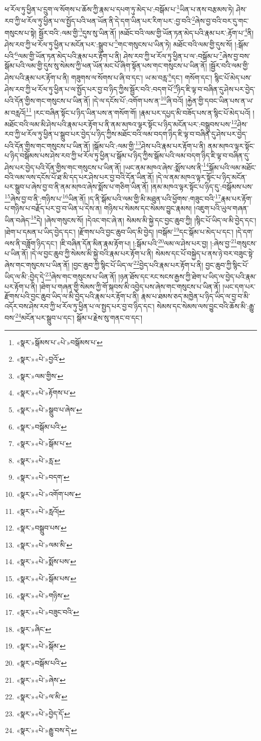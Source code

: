 ཕ་རོལ་ཏུ་ཕྱིན་པ་དྲུག་ལ་སོགས་པ་ཆོས་ཀྱི་རྣམ་པ་དཔག་ཏུ་མེད་པ་:བསྒོམ་པ་\footnote{«སྣར་»སྒོམས་པ་«པེ་»བསྒོམས་པ་}ཡིན་པ་ནས་བརྩམས་ཏེ། ཤེས་རབ་ཀྱི་ཕ་རོལ་ཏུ་ཕྱིན་པ་ལ་སྤྱོད་པའི་ཕན་ཡོན་ནི་དེ་དག་ཡིན་པར་རིག་པར་:བྱ་བའི་\footnote{«སྣར་»«པེ་»བྱའོ་}ཞེས་བྱ་བའི་བར་དུ་གང་གསུངས་པ་སྟེ། སྦྱོར་བའི་:ལམ་གྱི་\footnote{«སྣར་»ལམ་གྱིས་}དུས་སུ་ཡིན་ནོ། །མཐོང་བའི་ལམ་གྱི་ཡོན་ཏན་མེད་པའི་རྣམ་པར་:རྟོག་པ་\footnote{«སྣར་»«པེ་»རྟོགས་པ་}ནི། ཤེས་རབ་ཀྱི་ཕ་རོལ་ཏུ་ཕྱིན་པ་མངོན་པར་:སྒྲུབ་པ་\footnote{«སྣར་»«པེ་»སྒྲུབ་པ་ཞེས་}གང་གསུངས་པ་ཡིན་ཏེ། མཐོང་བའི་ལམ་གྱི་དུས་སོ། །:སྒོམ་པའི་\footnote{«སྣར་»བསྒོམ་པའི་}ལམ་གྱི་ཡོན་ཏན་མེད་པའི་རྣམ་པར་རྟོག་པ་ནི། ཤེས་རབ་ཀྱི་ཕ་རོལ་ཏུ་ཕྱིན་པ་ལ་:བསྒོམ་པ་\footnote{«སྣར་»«པེ་»སྒོམ་པ་}ཞེས་བྱ་བས་སྒོམ་པའི་ལམ་གྱི་དུས་སུ་སེམས་ཀྱི་ཕན་ཡོན་མང་པོ་ཞིག་སྟོན་པས་གང་གསུངས་པ་ཡིན་ནོ། །སྦྱོར་བའི་ལམ་གྱི་ཤེས་པའི་རྣམ་པར་རྟོག་པ་ནི། གཟུགས་ལ་སོགས་པ་ཞི་བ་དང་། ཡ་མ་བརླ་\footnote{«སྣར་»«པེ་»རླ་}དང་། གསོག་དང་། སྙིང་པོ་མེད་པས་ཤེས་རབ་ཀྱི་ཕ་རོལ་ཏུ་ཕྱིན་པ་ལ་སྤྱོད་པར་བྱ་བ་ཉིད་ཀྱིས་སྦྱོར་བའི་:བདག་པོ་\footnote{«སྣར་»«པེ་»བདག་}ཉིད་ཇི་ལྟ་བ་བཞིན་དུ་ཤེས་པར་བྱེད་པའི་དོན་གྱིས་གང་གསུངས་པ་ཡིན་ནོ། །དེ་ལ་དངོས་པོ་:འགོག་པས་ན་\footnote{«སྣར་»«པེ་»འགོག་པས་}ཞི་བའོ། །རྐྱེན་གྱི་དབང་ཡིན་པས་ན་ཡ་མ་བརླའོ།\footnote{«སྣར་»«པེ་»རླའོ།} །རང་བཞིན་སྟོང་པ་ཉིད་ཡིན་པས་ན་གསོག་གོ། །རྣམ་པར་དཔྱད་མི་བཟོད་པས་ན་སྙིང་པོ་མེད་པའོ། །མཐོང་བའི་ལམ་མི་ཤེས་པའི་རྣམ་པར་རྟོག་པ་ནི་ནམ་མཁའ་ལྟར་སྟོང་པ་ཉིད་མངོན་པར་:བསྒྲུབས་པས་\footnote{«སྣར་»བསྒྲུབ་པས་}ཤེས་རབ་ཀྱི་ཕ་རོལ་ཏུ་ཕྱིན་པ་སྒྲུབ་པར་བྱེད་པ་ཉིད་ཀྱིས་མཐོང་བའི་ལམ་བདག་ཉིད་ཇི་ལྟ་བ་བཞིན་དུ་ཤེས་པར་བྱེད་པའི་དོན་གྱིས་གང་གསུངས་པ་ཡིན་ནོ། །སྒོམ་པའི་:ལམ་གྱི་\footnote{«སྣར་»«པེ་»ལམ་མི་}ཤེས་པའི་རྣམ་པར་རྟོག་པ་ནི། ནམ་མཁའ་ལྟར་སྟོང་པ་ཉིད་བསྒོམས་པས་ཤེས་རབ་ཀྱི་ཕ་རོལ་ཏུ་ཕྱིན་པ་སྒོམ་པ་ཉིད་ཀྱིས་སྒོམ་པའི་ལམ་བདག་ཉིད་ཇི་ལྟ་བ་བཞིན་དུ་ཤེས་པར་བྱེད་པའི་དོན་གྱིས་གང་གསུངས་པ་ཡིན་ནོ། །ཡང་ནམ་མཁའ་ཞེས་:སྨོས་པས་ནི་\footnote{«སྣར་»«པེ་»སྨོས་པས་}སྒོམ་པའི་ལམ་མཐོང་བའི་ལམ་ལས་དངོས་པོ་ཐ་མི་དད་པར་ཤེས་པར་བྱ་བའི་དོན་ཡིན་ནོ། །དེ་ལ་ནམ་མཁའ་ལྟར་སྟོང་པ་ཉིད་མངོན་པར་སྒྲུབ་པ་ཞེས་བྱ་བ་ནི་ནམ་མཁའ་ཞེས་སྨོས་པ་གཅིག་ཡིན་ནོ། །ནམ་མཁའ་ལྟར་སྟོང་པ་ཉིད་དུ་:བསྒོམས་པས་\footnote{«སྣར་»«པེ་»སྒོམ་པས་}ཞེས་བྱ་བ་ནི་:གཉིས་པ་\footnote{«སྣར་»«པེ་»གཉིས་}ཡིན་ནོ། །ད་ནི་སྒོམ་པའི་ལམ་གྱི་མི་མཐུན་པའི་ཕྱོགས་:གཟུང་བའི་\footnote{«སྣར་»«པེ་»བཟུང་བའི་}རྣམ་པར་རྟོག་པ་གཉིས་པ་བརྗོད་པར་བྱ་བ་ཡིན་པ་དེས་ན། གཉིས་པ་སེམས་དང་སེམས་བྱུང་རྣམས། །འཇུག་པའི་ཡུལ་གཞན་ཡིན་བཞེད་\footnote{«སྣར་»ཞིང་}དེ། །ཞེས་གསུངས་སོ། །དེའང་གང་ཞེ་ན། སེམས་མི་སྐྱེ་དང་བྱང་ཆུབ་ཀྱི། །སྙིང་པོ་ཡིད་ལ་མི་བྱེད་དང་། །ཐེག་པ་དམན་པ་ཡིད་བྱེད་དང་། །རྫོགས་པའི་བྱང་ཆུབ་ཡིད་མི་བྱེད། །བསྒོམ་\footnote{«སྣར་»«པེ་»སྒོམ་}དང་སྒོམ་པ་མེད་པ་དང་། །དེ་དག་ལས་ནི་བཟློག་ཉིད་དང་། །ཇི་བཞིན་དོན་མིན་རྣམ་རྟོག་པ། །:སྒོམ་པའི་\footnote{«སྣར་»བསྒོམ་པའི་}ལམ་ལ་ཤེས་པར་བྱ། །:ཞེས་བྱ་\footnote{«སྣར་»«པེ་»ཞེས་}གསུངས་པ་ཡིན་ནོ། །དེ་ལ་བྱང་ཆུབ་ཀྱི་སེམས་མི་སྐྱེ་བའི་རྣམ་པར་རྟོག་པ་ནི། སེམས་དང་པོ་བསྐྱེད་པ་ནས་ཉེ་བར་བཟུང་སྟེ་ཞེས་གང་གསུངས་པ་ཡིན་ནོ། །བྱང་ཆུབ་ཀྱི་སྙིང་པོ་ཡིད་ལ་\footnote{«སྣར་»«པེ་»ལ་མི་}བྱེད་པའི་རྣམ་པར་རྟོག་པ་ནི། བྱང་ཆུབ་ཀྱི་སྙིང་པོ་ཡིད་ལ་མི་:བྱེད་དེ་\footnote{«སྣར་»«པེ་»བྱེད་དོ་}ཞེས་གང་གསུངས་པ་ཡིན་ནོ། །ཉན་ཐོས་དང་རང་སངས་རྒྱས་ཀྱི་ཐེག་པ་ཡིད་ལ་བྱེད་པའི་རྣམ་པར་རྟོག་པ་ནི། །ཐེག་པ་གཞན་གྱི་སེམས་ཀྱི་གོ་སྐབས་མི་འབྱེད་པས་ཞེས་གང་གསུངས་པ་ཡིན་ནོ། །ཡང་དག་པར་རྫོགས་པའི་བྱང་ཆུབ་ཡིད་ལ་མི་བྱེད་པའི་རྣམ་པར་རྟོག་པ་ནི། རྣམ་པ་ཐམས་ཅད་མཁྱེན་པ་ཉིད་ཡིད་ལ་བྱ་བ་མི་འདོར་བས་ཤེས་རབ་ཀྱི་ཕ་རོལ་ཏུ་ཕྱིན་པ་ལ་སྤྱད་པར་བྱ་བ་ཉིད་དང་། སེམས་དང་སེམས་ལས་བྱུང་བའི་ཆོས་མི་:རྒྱུ་བས་\footnote{«སྣར་»«པེ་»རྒྱུ་བས་དེ་}མངོན་པར་སྒྲུབ་པ་དང་། སྒོམ་པ་རྗེས་སུ་གནང་བ་དང་། 